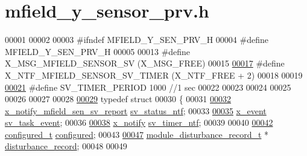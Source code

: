 \hypertarget{a00026_source}{\section{mfield\+\_\+y\+\_\+sensor\+\_\+prv.\+h}
\label{a00026_source}
}

\begin{DoxyCode}
00001 
00002 
00003 \textcolor{preprocessor}{#ifndef MFIELD\_Y\_SEN\_PRV\_H}
00004 \textcolor{preprocessor}{#define MFIELD\_Y\_SEN\_PRV\_H}
00005 
00013 \textcolor{preprocessor}{#define X\_MSG\_MFIELD\_SENSOR\_SV                      (X\_MSG\_FREE)}
00015 
\hypertarget{a00026_source_l00017}{}\hyperlink{a00026_ad9eede821e7c65d58f1806af4bd6bf29}{00017} \textcolor{preprocessor}{#define X\_NTF\_MFIELD\_SENSOR\_SV\_TIMER                                (X\_NTF\_FREE + 2)}
00018 
00019 
\hypertarget{a00026_source_l00021}{}\hyperlink{a00026_a8a535456285f4602701c814d7b69cc68}{00021} \textcolor{preprocessor}{#define SV\_TIMER\_PERIOD                             1000  //1 sec}
00022 
00023 
00024 
00025 
00026 
00027 
00028 
\hypertarget{a00026_source_l00029}{}\hyperlink{a00026}{00029} \textcolor{keyword}{typedef} \textcolor{keyword}{struct}
00030 \{
00031 
\hypertarget{a00026_source_l00032}{}\hyperlink{a00026_a752b00333ec308e07c6bd41aa9a01e73}{00032}        \hyperlink{a00019_dc/d41/a00862}{x\_notify\_mfield\_sen\_sv\_report}             
      \hyperlink{a00026_a752b00333ec308e07c6bd41aa9a01e73}{sv\_status\_ntf};
00033 
\hypertarget{a00026_source_l00035}{}\hyperlink{a00026_a43c345f39ea3aefbb60ef1ef57fe5d83}{00035}       \hyperlink{a00036_de/d37/a00849}{x\_event}                          \hyperlink{a00026_a43c345f39ea3aefbb60ef1ef57fe5d83}{sv\_task\_event};
00036 
\hypertarget{a00026_source_l00038}{}\hyperlink{a00026_ada91b200053f2d93e3639dc4ee3415b4}{00038}       \hyperlink{a00036_df/d4c/a00851}{x\_notify}                                    \hyperlink{a00026_ada91b200053f2d93e3639dc4ee3415b4}{sv\_timer\_ntf};
00039 
00040 
\hypertarget{a00026_source_l00042}{}\hyperlink{a00026_a94b2d1f6ea4ab334c74d24984dd27843}{00042}       \hyperlink{a00021_d6/d9c/a00352}{configured\_t}                               \hyperlink{a00026_a94b2d1f6ea4ab334c74d24984dd27843}{configured};
00043 
\hypertarget{a00026_source_l00047}{}\hyperlink{a00026_ac9b38e2c1d3f1013a88d33506c754152}{00047}       \hyperlink{a00028}{module\_disturbance\_record\_t}             *
      \hyperlink{a00026_ac9b38e2c1d3f1013a88d33506c754152}{disturbance\_record};
00048 
00049 

\end{DoxyCode}
